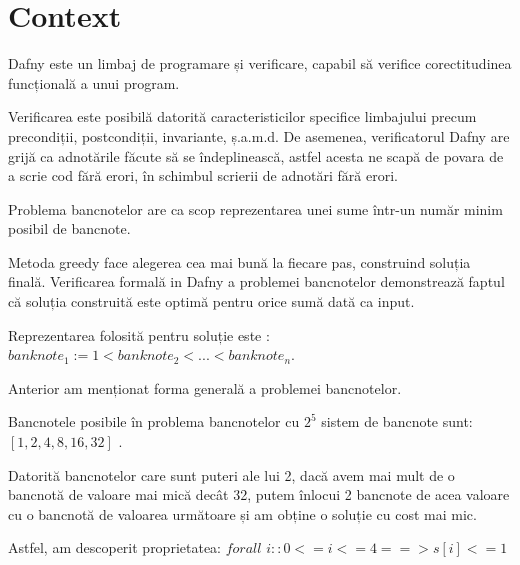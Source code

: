
\chapter{Context} 

 
Dafny este un limbaj de programare și verificare, capabil să verifice corectitudinea
funcțională a unui program.\par
Verificarea este posibilă datorită caracteristicilor specifice limbajului precum precondiții, postcondiții, 
invariante, ș.a.m.d. De asemenea, verificatorul Dafny are grijă ca adnotările făcute să se îndeplinească,
astfel acesta ne scapă de povara de a scrie cod fără erori, în schimbul scrierii de adnotări fără erori.
 
Problema bancnotelor are ca scop reprezentarea unei sume într-un număr minim posibil de bancnote.\par
Metoda greedy face alegerea cea mai bună la fiecare pas, construind soluția finală.
Verificarea formală in Dafny a problemei bancnotelor demonstrează faptul că soluția construită este optimă
pentru orice sumă dată ca input. \par
Reprezentarea folosită pentru soluție este :
$ banknote_{1}:= 1 < banknote_{2} < ... < banknote_{n} $. 

Anterior am menționat forma generală a problemei bancnotelor.\par
Bancnotele posibile în problema bancnotelor cu $2^{5}$ sistem de bancnote sunt: 
$[1, 2, 4, 8, 16, 32]$ . 

Datorită bancnotelor care sunt puteri ale lui 2, dacă avem mai mult de o bancnotă de valoare mai mică decât 32,
putem înlocui 2 bancnote de acea valoare cu o bancnotă de valoarea următoare și am obține o soluție cu cost mai mic.\par
Astfel, am descoperit proprietatea: 
$  forall$ $i :: 0 <= i <= 4 ==> s[i] <= 1 $


